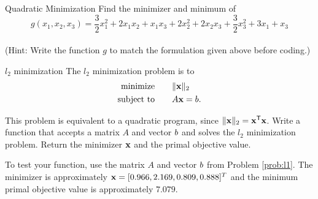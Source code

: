 \begin{problem}{Quadratic Minimization}
Find the minimizer and minimum of
\begin{equation*}
g(x_1,x_2,x_3) = \frac{3}{2}x_1^2 +2x_1x_2 + x_1x_3+ 2x_2^2 +2x_2x_3+\frac{3}{2}x_3^2+3x_1 + x_3
\end{equation*}
\\(Hint: Write the function $g$ to match the formulation given above before coding.)
\begin{comment}
\begin{equation}
f(x) = \frac{1}{2}x\trp Qx - x\trp p
\end{equation}
where

\begin{center}
$Q =
\begin{bmatrix}
3 & 2 & 1\\
2 & 4 & 2\\
1 & 2 & 3\\
\end{bmatrix}
$
and $p =
\begin{bmatrix}
3\\
0\\
1\\
\end{bmatrix}
$
\end{center}
\end{comment}

\end{problem}


\begin{problem}{$l_2$ minimization}
The $l_2$ minimization problem is to
\begin{align*}
\mbox{minimize}\qquad &\|\mathbf{x}\|_2\\
\mbox{subject to} \qquad &A\mathbf{x} = b.
\end{align*}

This problem is equivalent to a quadratic program, since $\|\mathbf{x}\|_2 = \mathbf{x}^{\mathsf T} \mathbf{x}$.
Write a function that accepts a matrix $A$ and vector $b$ and solves the $l_2$ minimization problem.
Return the minimizer $\mathbf{x}$ and the primal objective value.

To test your function, use the matrix $A$ and vector $b$ from Problem \ref{prob:l1}. 
The minimizer is approximately $\mathbf{x}=[0.966, 2.169, 0.809, 0.888]^T$ and the minimum primal objective value is approximately $7.079$.
\end{problem}
